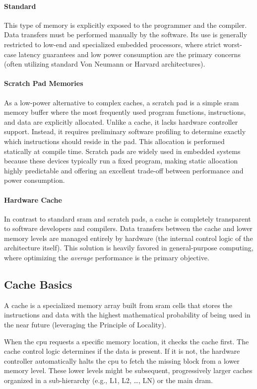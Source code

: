 \paragraph{Standard } 
This type of memory is explicitly exposed to the programmer and the compiler. Data transfers must be performed manually by the software. Its use is generally restricted to low-end and specialized embedded processors, where strict worst-case latency guarantees and low power consumption are the primary concerns (often utilizing standard Von Neumann or Harvard architectures).

\paragraph{Scratch Pad Memories}
As a low-power alternative to complex caches, a scratch pad is a simple \gls{sram} memory buffer where the most frequently used program functions, instructions, and data are explicitly allocated. Unlike a cache, it lacks hardware controller support. Instead, it requires preliminary software profiling to determine exactly which instructions should reside in the pad. This allocation is performed statically at compile time. Scratch pads are widely used in embedded systems because these devices typically run a fixed program, making static allocation highly predictable and offering an excellent trade-off between performance and power consumption.

\paragraph{Hardware Cache} 
In contrast to standard \gls{sram} and scratch pads, a cache is completely transparent to software developers and compilers. Data transfers between the cache and lower memory levels are managed entirely by hardware (the internal control logic of the architecture itself). This solution is heavily favored in general-purpose computing, where optimizing the \textit{average} performance is the primary objective.

\subsection{Cache Basics}
A cache is a specialized memory array built from \gls{sram} cells that stores the instructions and data with the highest mathematical probability of being used in the near future (leveraging the Principle of Locality). 

When the \gls{cpu} requests a specific memory location, it checks the cache first. The cache control logic determines if the data is present. If it is not, the hardware controller automatically halts the \gls{cpu} to fetch the missing block from a lower memory level. These lower levels might be subsequent, progressively larger caches organized in a sub-hierarchy (e.g., L1, L2, \dots, LN) or the main \gls{dram}.

